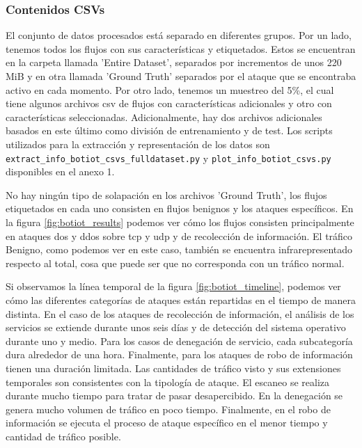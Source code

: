 \subsubsection{Contenidos CSVs}

El conjunto de datos procesados está separado en diferentes grupos. Por un lado, tenemos todos los flujos con sus características y etiquetados. Estos se encuentran en la carpeta llamada 'Entire Dataset', separados por incrementos de unos 220 MiB y en otra llamada 'Ground Truth' separados por  el ataque que se encontraba activo en cada momento. Por otro lado, tenemos un muestreo del 5\%, el cual tiene algunos archivos \acrshort{csv} de flujos con características adicionales y otro con características seleccionadas. Adicionalmente, hay dos archivos adicionales basados en este último como división de entrenamiento y de test. Los scripts utilizados para la extracción y representación de los datos son \texttt{extract\_info\_botiot\_csvs\_fulldataset.py} y \texttt{plot\_info\_botiot\_csvs.py} disponibles en el anexo 1.

No hay ningún tipo de solapación en los archivos 'Ground Truth', los flujos etiquetados en cada uno consisten en flujos benignos y los ataques específicos. En la figura \ref{fig:botiot_results} podemos ver cómo los flujos consisten principalmente en ataques \acrshort{dos} y \acrshort{ddos} sobre \acrshort{tcp} y \acrshort{udp} y de recolección de información. El tráfico Benigno, como podemos ver en este caso, también se encuentra infrarepresentado respecto al total, cosa que puede ser que no corresponda con un tráfico normal.

Si observamos la línea temporal de la figura \ref{fig:botiot_timeline}, podemos ver cómo las diferentes categorías de ataques están repartidas en el tiempo de manera distinta. En el caso de los ataques de recolección de información, el análisis de los servicios se extiende durante unos seis días y de detección del sistema operativo durante uno y medio. Para los casos de denegación de servicio, cada subcategoría dura alrededor de una hora. Finalmente, para los ataques de robo de información tienen una duración limitada. Las cantidades de tráfico visto y sus extensiones temporales son consistentes con la tipología de ataque. El escaneo se realiza durante mucho tiempo para tratar de pasar desapercibido. En la denegación se genera mucho volumen de tráfico en poco tiempo. Finalmente, en el robo de información se ejecuta el proceso de ataque específico en el menor tiempo y cantidad de tráfico posible.

